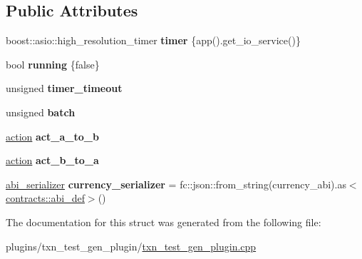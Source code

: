 \subsection*{Public Attributes}
\begin{DoxyCompactItemize}
\item 
\mbox{\label{structaacio_1_1txn__test__gen__plugin__impl_ab40f31a42476f6adb5a1cd424e98330e}} 
boost\+::asio\+::high\+\_\+resolution\+\_\+timer {\bfseries timer} \{app().get\+\_\+io\+\_\+service()\}
\item 
\mbox{\label{structaacio_1_1txn__test__gen__plugin__impl_ae90a390f31f5414136c51b9d0a42c0d0}} 
bool {\bfseries running} \{false\}
\item 
\mbox{\label{structaacio_1_1txn__test__gen__plugin__impl_ad13a5802a9fea7c83f6c254f6b280b42}} 
unsigned {\bfseries timer\+\_\+timeout}
\item 
\mbox{\label{structaacio_1_1txn__test__gen__plugin__impl_a412f5cdc56610a2489011b714663c3b7}} 
unsigned {\bfseries batch}
\item 
\mbox{\label{structaacio_1_1txn__test__gen__plugin__impl_a7f5849ed1a8c3d2d0dadd91c443d2f1e}} 
\mbox{\hyperlink{structaacio_1_1action}{action}} {\bfseries act\+\_\+a\+\_\+to\+\_\+b}
\item 
\mbox{\label{structaacio_1_1txn__test__gen__plugin__impl_a81799edfa842f8f80b2997e19a615ab2}} 
\mbox{\hyperlink{structaacio_1_1action}{action}} {\bfseries act\+\_\+b\+\_\+to\+\_\+a}
\item 
\mbox{\label{structaacio_1_1txn__test__gen__plugin__impl_aaff067c61a3dec7e9a04fadf3d5aca59}} 
\mbox{\hyperlink{structaacio_1_1chain_1_1contracts_1_1abi__serializer}{abi\+\_\+serializer}} {\bfseries currency\+\_\+serializer} = fc\+::json\+::from\+\_\+string(currency\+\_\+abi).as$<$\mbox{\hyperlink{structaacio_1_1chain_1_1contracts_1_1abi__def}{contracts\+::abi\+\_\+def}}$>$()
\end{DoxyCompactItemize}


The documentation for this struct was generated from the following file\+:\begin{DoxyCompactItemize}
\item 
plugins/txn\+\_\+test\+\_\+gen\+\_\+plugin/\mbox{\hyperlink{txn__test__gen__plugin_8cpp}{txn\+\_\+test\+\_\+gen\+\_\+plugin.\+cpp}}\end{DoxyCompactItemize}
